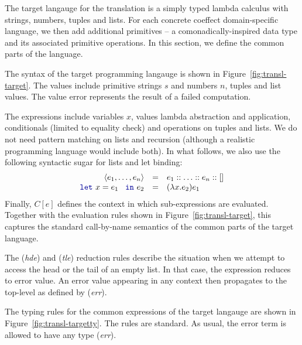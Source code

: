 \documentclass[
		twoside,openright,titlepage,numbers=noenddot,headinclude,%
                footinclude=true,cleardoublepage=empty,
                BCOR=10mm,paper=a4,fontsize=10pt, %
                ngerman,american, %
                ]{scrreprt}
\newcommand{\kvd}[1]{\textnormal{\textcolor{kvdclr}{\ttfamily #1}}}
\newcommand{\ident}[1]{\textnormal{\sffamily #1}}
\begin{document}
The target langauge for the translation is a simply typed lambda calculus with strings, numbers,
tuples and lists. For each concrete coeffect domain-specific language, we then add additional
primitives -- a comonadically-inspired data type and its associated primitive operations. In this
section, we define the common parts of the language.

The syntax of the target programming langauge is shown in Figure~\ref{fig:transl-target}. 
The values include primitive strings $s$ and numbers $n$, tuples and list values. The value
\ident{error} represents the result of a failed computation.

The expressions include variables $x$, values lambda abstraction and application, conditionals
(limited to equality check) and operations on tuples and lists. We do not need pattern matching
on lists and recursion (although a realistic programming language would include both). In what
follows, we also use the following syntactic sugar for lists and let binding:
%
\begin{equation*}
\begin{array}{rcl}
  \langle e_1, \ldots, e_n \rangle &=& e_1 :: \ldots :: e_n :: [] \\
  \kvd{let}~x=e_1~\kvd{in}~e_2 &=& (\lambda x.e_2) e_1 \\
\end{array}
\end{equation*}
%
Finally, $C[e]$ defines the context in which sub-expressions are evaluated. Together with the
evaluation rules shown in  Figure~\ref{fig:transl-target}, this captures the standard call-by-name
semantics of the common parts of the target language.

The (\emph{hde}) and (\emph{tle}) reduction rules describe the situation when we attempt to access
the head or the tail of an empty list. In that case, the expression reduces to \ident{error} value.
An \ident{error} value appearing in any context then propagates to the top-level as defined by 
(\emph{err}).

The typing rules for the common expressions of the target langauge are shown in 
Figure~\ref{fig:transl-targetty}. The rules are standard. As usual, the 
\ident{error} term is allowed to have any type (\emph{err}).

\end{document}
